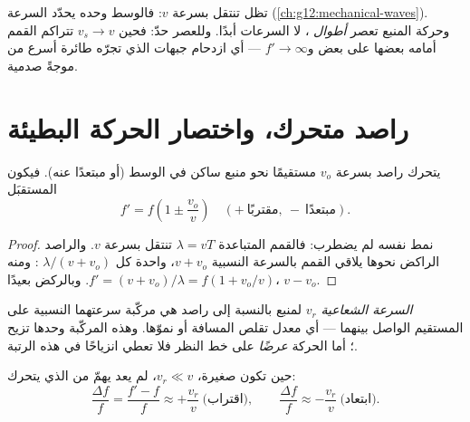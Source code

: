 \begin{remark}\label{rem:g12:doppler-effect:speed-unchanged}
تظل  تنتقل بسرعة $v$: فالوسط وحده يحدّد السرعة
(\cref{ch:g12:mechanical-waves}). وحركة المنبع تعصر \emph{أطوال }، لا
السرعات أبدًا. وللعصر حدّ: فحين $v_s \to v$ تتراكم القمم أمامه بعضها على بعض
و$f' \to \infty$ --- أي ازدحام جبهات  الذي تجرّه طائرة أسرع من  موجةً صدمية.
\end{remark}

\section{راصد متحرك، واختصار الحركة البطيئة}

\begin{proposition}\label{prop:g12:doppler-effect:moving-observer}
يتحرك راصد بسرعة $v_o$ مستقيمًا نحو منبع ساكن في الوسط (أو مبتعدًا عنه).
فيكون  المستقبَل
\[ f' = f\left(1 \pm \frac{v_o}{v}\right) \quad (+\ \text{مقتربًا},\ -\ \text{مبتعدًا}). \]
\end{proposition}

\begin{proof}
نمط  نفسه لم يضطرب: فالقمم المتباعدة $\lambda = vT$ تنتقل بسرعة $v$. والراصد
الراكض نحوها يلاقي القمم بالسرعة النسبية $v + v_o$، واحدة كل
$\lambda/(v + v_o)$ : ومنه $f' = (v + v_o)/\lambda = f(1 + v_o/v)$. وبالركض بعيدًا، $v - v_o$.
\end{proof}

\begin{definition}\label{def:g12:doppler-effect:radial}
\emph{السرعة الشعاعية} $v_r$ لمنبع بالنسبة إلى
راصد هي مركّبة سرعتهما النسبية على المستقيم الواصل بينهما --- أي
معدل تقلص المسافة أو نموّها. وهذه المركّبة وحدها تزيح ؛
أما الحركة \emph{عرضًا} على خط النظر فلا تعطي انزياحًا في هذه الرتبة.
\end{definition}

\begin{proposition}\label{prop:g12:doppler-effect:slow}
حين تكون  صغيرة، $v_r \ll v$، لم يعد يهمّ من الذي يتحرك:
\[
\frac{\Delta f}{f} = \frac{f' - f}{f} \approx +\frac{v_r}{v} \ \text{(اقتراب)},
\qquad
\frac{\Delta f}{f} \approx -\frac{v_r}{v} \ \text{(ابتعاد)}.
\]
\end{proposition}

